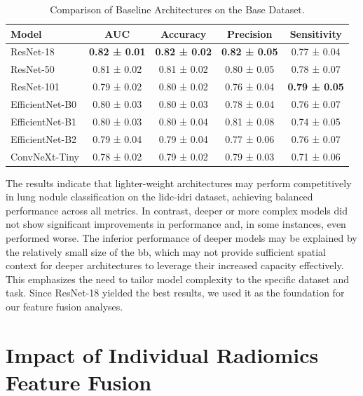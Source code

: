 \begin{table}[ht]
    \centering
    \caption{Comparison of Baseline Architectures on the Base Dataset.}
    \label{tab:baseline_comparison}
    \begin{tabular}{lcccc}
        \toprule
        \textbf{Model} & \textbf{AUC} & \textbf{Accuracy} & \textbf{Precision} & \textbf{Sensitivity} \\
        \midrule
        ResNet-18         & \textbf{0.82 ± 0.01} & \textbf{0.82 ± 0.02} & \textbf{0.82 ± 0.05} & 0.77 ± 0.04 \\
        ResNet-50         & 0.81 ± 0.02 & 0.81 ± 0.02 & 0.80 ± 0.05 & 0.78 ± 0.07 \\
        ResNet-101        & 0.79 ± 0.02 & 0.80 ± 0.02 & 0.76 ± 0.04 & \textbf{0.79 ± 0.05} \\ \hline \addlinespace
        EfficientNet-B0   & 0.80 ± 0.03 & 0.80 ± 0.03 & 0.78 ± 0.04 & 0.76 ± 0.07 \\
        EfficientNet-B1   & 0.80 ± 0.03 & 0.80 ± 0.04 & 0.81 ± 0.08 & 0.74 ± 0.05 \\
        EfficientNet-B2   & 0.79 ± 0.04 & 0.79 ± 0.04 & 0.77 ± 0.06 & 0.76 ± 0.07 \\ \hline \addlinespace
        ConvNeXt-Tiny     & 0.78 ± 0.02 & 0.79 ± 0.02 & 0.79 ± 0.03 & 0.71 ± 0.06 \\		
        \bottomrule
    \end{tabular}
\end{table}

The results indicate that lighter-weight architectures may perform competitively in lung nodule classification on the \ac{lidc-idri} dataset, achieving balanced performance across all metrics. In contrast, deeper or more complex models did not show significant improvements in performance and, in some instances, even performed worse. The inferior performance of deeper models may be explained by the relatively small size of the \ac{bb}, which may not provide sufficient spatial context for deeper architectures to leverage their increased capacity effectively. This emphasizes the need to tailor model complexity to the specific dataset and task. Since ResNet-18 yielded the best results, we used it as the foundation for our feature fusion analyses.

\FloatBarrier

\section{Impact of Individual Radiomics Feature Fusion}

